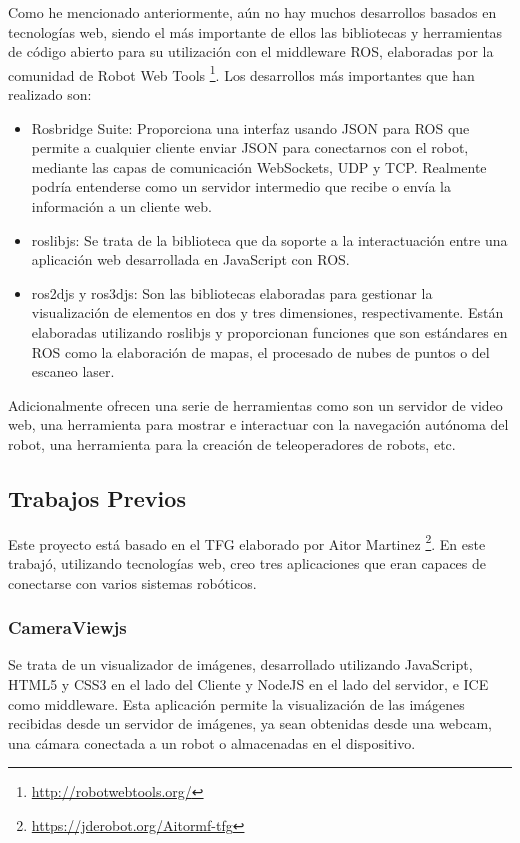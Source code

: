 Como he mencionado anteriormente, aún no hay muchos desarrollos basados en tecnologías web, siendo el más importante de ellos las bibliotecas y herramientas de código abierto para su utilización con el middleware ROS, elaboradas por la comunidad de Robot Web Tools \footnote{\url{http://robotwebtools.org/}}.
Los desarrollos más importantes que han realizado son:
\begin{itemize}
	\item Rosbridge Suite: Proporciona una interfaz usando JSON para ROS que permite a cualquier cliente enviar JSON para conectarnos con el robot, mediante las capas de comunicación WebSockets, UDP y TCP. Realmente podría entenderse como un servidor intermedio que recibe o envía la información a un cliente web.
	\item roslibjs: Se trata de la biblioteca que da soporte a la interactuación entre una aplicación web desarrollada en JavaScript con ROS. 
	\item ros2djs y ros3djs: Son las bibliotecas elaboradas para gestionar la visualización de elementos en dos y tres dimensiones, respectivamente. Están elaboradas utilizando roslibjs y proporcionan funciones que son estándares en ROS como la elaboración de mapas, el procesado de nubes de puntos o del escaneo laser.
\end{itemize}

Adicionalmente ofrecen una serie de herramientas como son un servidor de video web, una herramienta para mostrar e interactuar con la navegación autónoma del robot, una herramienta para la creación de teleoperadores de robots, etc.

\subsection{Trabajos Previos}
Este proyecto está basado en el TFG elaborado por Aitor Martinez \footnote{\url{https://jderobot.org/Aitormf-tfg}}. En este trabajó, utilizando tecnologías web, creo tres aplicaciones que eran capaces de conectarse con varios sistemas robóticos.

\subsubsection{CameraViewjs}

Se trata de un visualizador de imágenes, desarrollado utilizando JavaScript, HTML5 y CSS3 en el lado del Cliente y NodeJS en el lado del servidor, e ICE como middleware. Esta aplicación permite la visualización de las imágenes recibidas desde un servidor de imágenes, ya sean obtenidas desde una webcam, una cámara conectada a un robot o almacenadas en el dispositivo.

